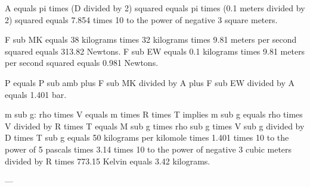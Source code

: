 A equals pi times (D divided by 2) squared equals pi times (0.1 meters divided by 2) squared equals 7.854 times 10 to the power of negative 3 square meters.  

F sub MK equals 38 kilograms times 32 kilograms times 9.81 meters per second squared equals 313.82 Newtons.  
F sub EW equals 0.1 kilograms times 9.81 meters per second squared equals 0.981 Newtons.  

P equals P sub amb plus F sub MK divided by A plus F sub EW divided by A equals 1.401 bar.  

m sub g: rho times V equals m times R times T implies m sub g equals rho times V divided by R times T equals M sub g times rho sub g times V sub g divided by D times T sub g equals 50 kilograms per kilomole times 1.401 times 10 to the power of 5 pascals times 3.14 times 10 to the power of negative 3 cubic meters divided by R times 773.15 Kelvin equals 3.42 kilograms.  

---